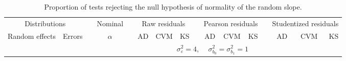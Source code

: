 \begin{table}[ht]
\begin{scriptsize}
\begin{tabular}{ll p{.1cm} c p{.1cm} rrr p{.1cm} rrr p{.1cm} rrr}
   \hline
\end{tabular}
\end{scriptsize}
\end{table}


\begin{table}[ht]
\centering
\caption{\label{tab:evalb1} Proportion of tests rejecting the null hypothesis of normality of the random slope.}
\begin{scriptsize}
\begin{tabular}{ll p{.1cm} c p{.1cm} rrr p{.1cm} rrr p{.1cm} rrr}
  \hline
  \multicolumn{2}{c}{Distributions}& & Nominal & &  \multicolumn{3}{c}{Raw residuals} & & \multicolumn{3}{c}{Pearson residuals} & & \multicolumn{3}{c}{Studentized residuals}\\ \cline{1-2} \cline{6-8} \cline{10-12} \cline{14-16}
  Random effects & Errors & & $\alpha$ & & AD & CVM & KS & & AD & CVM & KS & & AD & CVM & KS \\ 
   \hline
& && && \multicolumn{9}{c}{$\sigma_{\varepsilon}^2 = 4$, \ \ $\sigma_{b_0}^2 = \sigma_{b_1}^2 = 1$} \\ \cline{6-16}


\end{tabular}
\end{scriptsize}
\end{table}
